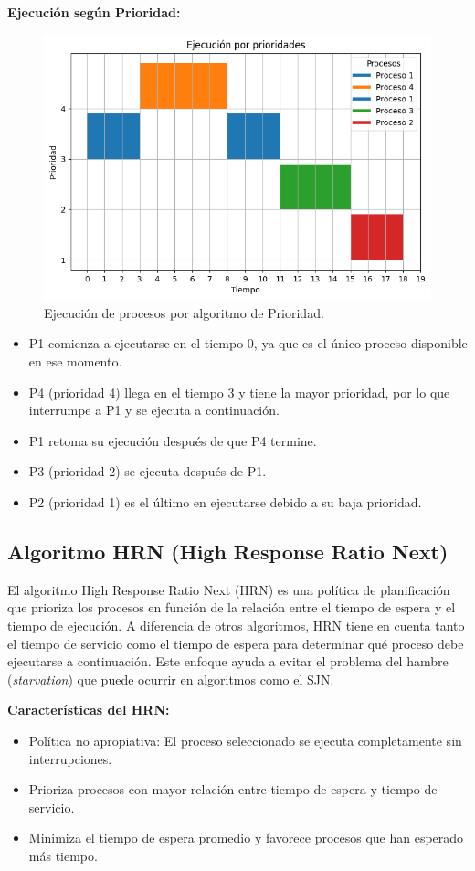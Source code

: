 \textbf{Ejecución según Prioridad:}

\begin{figure}[H] \centering \includegraphics[width=0.8\linewidth]{Imagenes/prioridades.png}
	\caption{Ejecución de procesos por algoritmo de Prioridad.} 
\end{figure}

\begin{itemize}
	\item P1 comienza a ejecutarse en el tiempo 0, ya que es el único proceso disponible en ese momento.
	\item P4 (prioridad 4) llega en el tiempo 3 y tiene la mayor prioridad, por lo que interrumpe a P1 y se ejecuta a continuación.
	\item P1 retoma su ejecución después de que P4 termine.
	\item P3 (prioridad 2) se ejecuta después de P1.
	\item P2 (prioridad 1) es el último en ejecutarse debido a su baja prioridad.
\end{itemize}
\subsection{Algoritmo HRN (High Response Ratio Next)}

El algoritmo High Response Ratio Next (HRN) es una política de planificación que prioriza los procesos en función de la relación entre el tiempo de espera y el tiempo de ejecución. A diferencia de otros algoritmos, HRN tiene en cuenta tanto el tiempo de servicio como el tiempo de espera para determinar qué proceso debe ejecutarse a continuación. Este enfoque ayuda a evitar el problema del hambre (\textit{starvation}) que puede ocurrir en algoritmos como el SJN.

\textbf{Características del HRN:}
\begin{itemize}
	\item Política no apropiativa: El proceso seleccionado se ejecuta completamente sin interrupciones.
	\item Prioriza procesos con mayor relación entre tiempo de espera y tiempo de servicio.
	\item Minimiza el tiempo de espera promedio y favorece procesos que han esperado más tiempo.
\end{itemize}

